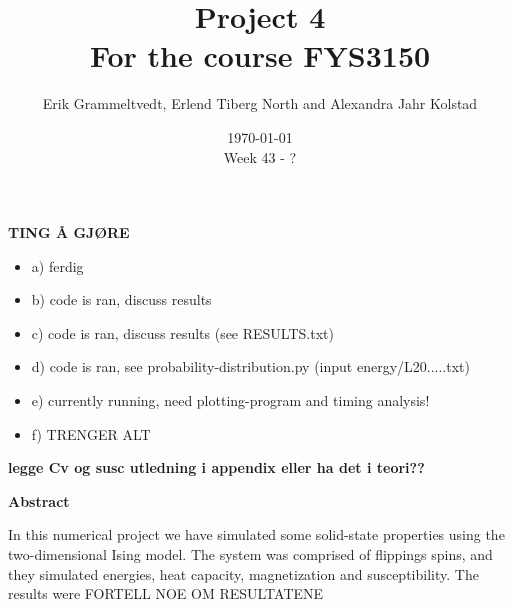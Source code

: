 \documentclass{article}
\begin{document}
\addtocounter{page}{0}

\title{Project 4 \\
      \large For the course FYS3150}
\date{\today \\
    \vspace{1mm}
    \large Week 43 - ?}

\author{Erik Grammeltvedt, Erlend Tiberg North and Alexandra Jahr Kolstad}

\maketitle




\textbf{TING Å GJØRE}
\begin{itemize}
  \item a) ferdig
  \item b) code is ran, discuss results
  \item c) code is ran, discuss results (see RESULTS.txt)
  \item d) code is ran, see probability-distribution.py (input energy/L20.....txt)
  \item e) currently running, need plotting-program and timing analysis!
  \item f) TRENGER ALT
\end{itemize}

\textbf{legge Cv og susc utledning i appendix eller ha det i teori??}


\vspace{1cm}


\begin{center}

{\Large\textbf{Abstract}} \label{sec:Abstract}

\end{center}

In this numerical project we have simulated some solid-state properties using the two-dimensional Ising model. The system was comprised of flippings spins, and they simulated energies, heat capacity, magnetization and susceptibility.
The results were FORTELL NOE OM RESULTATENE

\newpage

\end{document}
